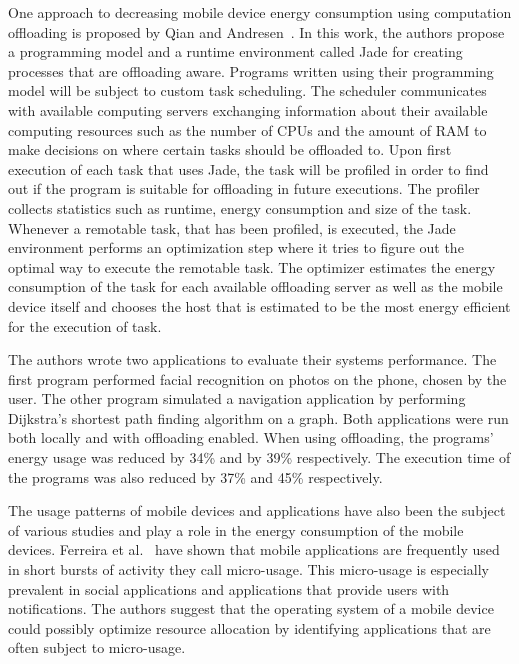 One approach to decreasing mobile device energy consumption using computation offloading is proposed by Qian and Andresen~\cite{7176219}. In this work, the authors propose a programming model and a runtime environment called Jade for creating processes that are offloading aware. Programs written using their programming model will be subject to custom task scheduling. The scheduler communicates with available computing servers exchanging information about their available computing resources such as the number of CPUs and the amount of RAM to make decisions on where certain tasks should be offloaded to. Upon first execution of each task that uses Jade, the task will be profiled in order to find out if the program is suitable for offloading in future executions. The profiler collects statistics such as runtime, energy consumption and size of the task. Whenever a remotable task, that has been profiled, is executed, the Jade environment performs an optimization step where it tries to figure out the optimal way to execute the remotable task. The optimizer estimates the energy consumption of the task for each available offloading server as well as the mobile device itself and chooses the host that is estimated to be the most energy efficient for the execution of task.

The authors wrote two applications to evaluate their systems performance. The first program performed facial recognition on photos on the phone, chosen by the user. The other program simulated a navigation application by performing Dijkstra's shortest path finding algorithm on a graph. Both applications were run both locally and with offloading enabled. When using offloading, the programs' energy usage was reduced by 34\% and by 39\% respectively. The execution time of the programs was also reduced by 37\% and 45\% respectively.                 


The usage patterns of mobile devices and applications have also been the subject of various studies and play a role in the energy consumption of the mobile devices. Ferreira et al.~\cite{Ferreira:2014:CES:2628363.2628367} have shown that mobile applications are frequently used in short bursts of activity they call micro-usage. This micro-usage is especially prevalent in social applications and applications that provide users with notifications. The authors suggest that the operating system of a mobile device could possibly optimize resource allocation by identifying applications that are often subject to micro-usage.

